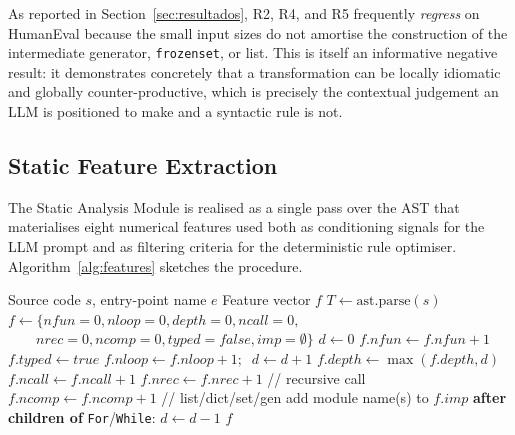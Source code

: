 \documentclass[conference]{IEEEtran}
\begin{document}
As reported in Section~\ref{sec:resultados}, R2, R4, and R5 frequently \emph{regress} on HumanEval because the small input sizes do not amortise the construction of the intermediate generator, \texttt{frozenset}, or list. This is itself an informative negative result: it demonstrates concretely that a transformation can be locally idiomatic and globally counter-productive, which is precisely the contextual judgement an LLM is positioned to make and a syntactic rule is not.

\subsection{Static Feature Extraction}
The Static Analysis Module is realised as a single pass over the AST that materialises eight numerical features used both as conditioning signals for the LLM prompt and as filtering criteria for the deterministic rule optimiser. Algorithm~\ref{alg:features} sketches the procedure.

\begin{algorithm}[htbp]
\caption{Static feature extraction over the AST}
\label{alg:features}
\begin{algorithmic}[1]
\REQUIRE Source code $s$, entry-point name $e$
\ENSURE Feature vector $f$
\STATE $T \leftarrow \mathrm{ast.parse}(s)$
\STATE $f \leftarrow \{\mathit{nfun} \!\!=\!\! 0, \mathit{nloop}\!\!=\!\!0, \mathit{depth}\!\!=\!\!0, \mathit{ncall}\!\!=\!\!0,$
\STATE $\quad\quad \mathit{nrec}\!\!=\!\!0, \mathit{ncomp}\!\!=\!\!0, \mathit{typed}\!\!=\!\!\mathit{false}, \mathit{imp}\!\!=\!\!\emptyset\}$
\STATE $d \leftarrow 0$
    \STATE $f.\mathit{nfun} \leftarrow f.\mathit{nfun}+1$
      \STATE $f.\mathit{typed} \leftarrow \mathit{true}$
    \ENDIF
    \STATE $f.\mathit{nloop} \leftarrow f.\mathit{nloop}+1; \;\; d \leftarrow d+1$
    \STATE $f.\mathit{depth} \leftarrow \max(f.\mathit{depth}, d)$
    \STATE $f.\mathit{ncall} \leftarrow f.\mathit{ncall}+1$
      \STATE $f.\mathit{nrec} \leftarrow f.\mathit{nrec}+1$ \quad // recursive call
    \ENDIF
    \STATE $f.\mathit{ncomp} \leftarrow f.\mathit{ncomp}+1$ \quad // list/dict/set/gen
    \STATE add module name(s) to $f.\mathit{imp}$
  \ENDIF
  \STATE \textbf{after children of} \texttt{For}/\texttt{While}: $d \leftarrow d-1$
\ENDFOR
\RETURN $f$
\end{algorithmic}
\end{algorithm}
\end{document}
